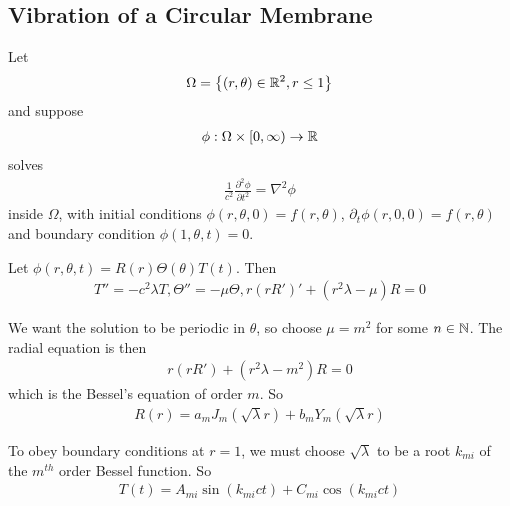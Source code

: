 \documentclass[a4paper]{article}
\begin{document}
\subsection{Vibration of a Circular Membrane}
Let $$\Omega = \left\{ \left(r,\theta\right) \in \mathbb{R}^2, r\leq 1\right\}$$ and suppose
\begin{equation*}
\begin{aligned}
\phi: \Omega \times \left[0,\infty\right) \to \mathbb{R}
\end{aligned}
\end{equation*}
solves
\begin{equation*}
\begin{aligned}
\frac{1}{c^2}\frac{\partial^2 \phi}{\partial t^2} = \nabla^2 \phi
\end{aligned}
\end{equation*}
inside $\Omega$, with initial conditions $\phi\left(r,\theta,0\right) = f\left(r,\theta\right)$, $\partial_t\phi\left(r,0,0\right) = f\left(r,\theta\right)$ and boundary condition $\phi\left(1,\theta,t\right) = 0$.

Let $\phi\left(r,\theta,t\right) = R\left(r\right)\Theta\left(\theta\right)T\left(t\right)$. Then
\begin{equation*}
\begin{aligned}
T'' = -c^2 \lambda T, \Theta'' = -\mu \Theta, r\left(rR'\right)' + \left(r^2 \lambda - \mu\right) R = 0
\end{aligned}
\end{equation*}

We want the solution to be periodic in $\theta$, so choose $\mu = m^2$ for some $n \in \mathbb{N}$. The radial equation is then
\begin{equation*}
\begin{aligned}
r\left(rR'\right) + \left(r^2\lambda - m^2\right)R = 0
\end{aligned}
\end{equation*}
which is the Bessel's equation of order $m$. So
\begin{equation*}
\begin{aligned}
R\left(r\right) = a_m J_m \left(\sqrt{\lambda} r \right) + b_m Y_m \left(\sqrt{\lambda} r\right)
\end{aligned}
\end{equation*}

To obey boundary conditions at $r=1$, we must choose $\sqrt{\lambda}$ to be a root $k_{mi}$ of the $m^{th}$ order Bessel function. So
\begin{equation*}
\begin{aligned}
T\left(t\right) = A_{mi}\sin\left(k_{mi} ct\right) + C_{mi} \cos\left(k_{mi} ct\right)
\end{aligned}
\end{equation*}
\end{document}
